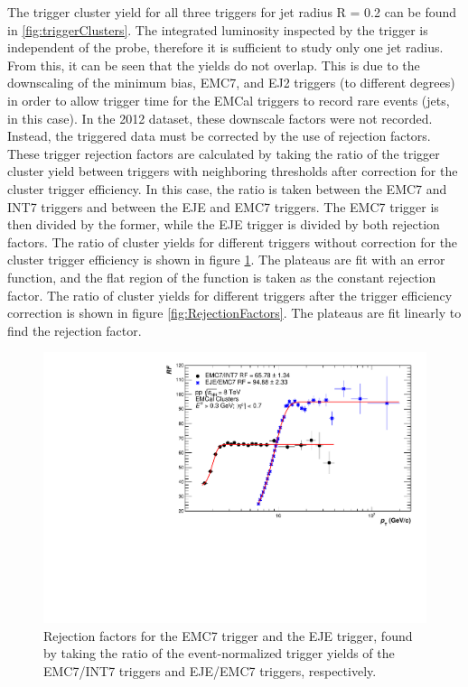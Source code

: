 The trigger cluster yield for all three triggers for jet radius R = 0.2 can be found in \ref{fig:triggerClusters}. The integrated luminosity inspected by the trigger is independent of the probe, therefore it is sufficient to study only one jet radius. From this, it can be seen that the yields do not overlap. This is due to the downscaling of the minimum bias, EMC7, and EJ2 triggers (to different degrees) in order to allow trigger time for the EMCal triggers to record rare events (jets, in this case). In the 2012 dataset, these downscale factors were not recorded. Instead, the triggered data must be corrected by the use of rejection factors. These trigger rejection factors are calculated by taking the ratio of the trigger cluster yield between triggers with neighboring thresholds after correction for the cluster trigger efficiency. In this case, the ratio is taken between the EMC7 and INT7 triggers and between the EJE and EMC7 triggers. The EMC7 trigger is then divided by the former, while the EJE trigger is divided by both rejection factors. The ratio of cluster yields for different triggers without correction for the cluster trigger efficiency is shown in figure \ref{fig:RejectionFactorsUnscaled}. The plateaus are fit with an error function, and the flat region of the function is taken as the constant rejection factor. The ratio of cluster yields for different triggers after the trigger efficiency correction is shown in figure \ref{fig:RejectionFactors}. The plateaus are fit linearly to find the rejection factor.

\begin{figure}
    \centering
    \includegraphics[width=15cm]{figures/RejectionFactors/RF_R02_Unscaled.pdf}
    \caption{Rejection factors for the EMC7 trigger and the EJE trigger, found by taking the ratio of the event-normalized trigger yields of the EMC7/INT7 triggers and EJE/EMC7 triggers, respectively.}
    \label{fig:RejectionFactorsUnscaled}
\end{figure}

